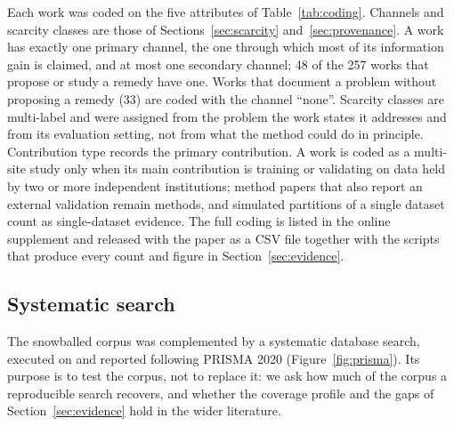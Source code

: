 \documentclass[acmsmall,screen,review]{acmart}
\theoremstyle{acmdefinition}
\begin{document}
Each work was coded on the five attributes of Table~\ref{tab:coding}. Channels and scarcity classes are those of Sections~\ref{sec:scarcity} and~\ref{sec:provenance}. A work has exactly one primary channel, the one through which most of its information gain is claimed, and at most one secondary channel; 48 of the 257 works that propose or study a remedy have one. Works that document a problem without proposing a remedy (33) are coded with the channel ``none''. Scarcity classes are multi-label and were assigned from the problem the work states it addresses and from its evaluation setting, not from what the method could do in principle. Contribution type records the primary contribution. A work is coded as a multi-site study only when its main contribution is training or validating on data held by two or more independent institutions; method papers that also report an external validation remain methods, and simulated partitions of a single dataset count as single-dataset evidence. The full coding is listed in the online supplement and released with the paper as a CSV file together with the scripts that produce every count and figure in Section~\ref{sec:evidence}.

\subsection{Systematic search}\label{sec:search}

The snowballed corpus was complemented by a systematic database search, executed on \PrismaSearchDate{} and reported following PRISMA 2020 \cite{page2021prisma} (Figure~\ref{fig:prisma}). Its purpose is to test the corpus, not to replace it: we ask how much of the corpus a reproducible search recovers, and whether the coverage profile and the gaps of Section~\ref{sec:evidence} hold in the wider literature.
\end{document}
